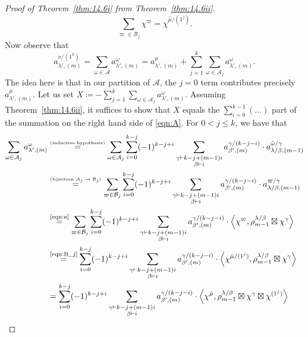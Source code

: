 \begin{proof}[Proof of Theorem~\ref{thm:14.6i} from Theorem~\ref{thm:14.6ii}]
	\begin{equation}\label{eqn:B_j}
		\sum_{\varpi\in\mathcal{B}_j}\chi^\varpi = \chi^{\hat{\mu}/(1^j)}.
	\end{equation}
	Now observe that
	\[ a^{\nu/(1^k)}_{\lambda',(m)} = \sum_{\omega\in\mathcal{A}} a^{\omega}_{\lambda',(m)} = a^{\mu}_{\lambda',(m)} + \sum_{j=1}^k \sum_{\omega\in\mathcal{A}_j} a^{\omega}_{\lambda',(m)}. \]
	The idea here is that in our partition of $\mathcal{A}$, the $j=0$ term contributes precisely $a^{\mu}_{\lambda',(m)}$. Let us set $X \coloneqq  -\sum_{j=1}^k \sum_{\omega\in\mathcal{A}_j} a^{\omega}_{\lambda',(m)}$. Assuming Theorem~\ref{thm:14.6ii}, it suffices to show that $X$ equals the $\sum_{i=0}^{k-1}(\dotsc)$ part of the summation on the right hand side of \eqref{eqn:A}. For $0<j\leq k$, we have that
	\begin{align*}
		\sum_{\omega\in\mathcal{A}_j} a^{\omega}_{\lambda',(m)} &\overset{\text{\normalfont\tiny(inductive hypothesis)}}{=} \sum_{\omega\in\mathcal{A}_j} \sum_{i=0}^{k-j}(-1)^{k-j+i}\sum_{\substack{\gamma\vdash k-j + (m-1)i\\ \beta\vdash i}}a^{\gamma/(k-j-i)}_{\beta',(m)}\cdot a^{\hat{\omega}/\gamma}_{\lambda/\beta,(m-1)}\\
		&\overset{\text{\normalfont\tiny(bijection $\mathcal{A}_j\to\mathcal{B}_j$)}}{=}\sum_{\varpi\in\mathcal{B}_j} \sum_{i=0}^{k-j}(-1)^{k-j+i}\sum_{\substack{\gamma\vdash k-j + (m-1)i\\ \beta\vdash i}}a^{\gamma/(k-j-i)}_{\beta',(m)}\cdot a^{\varpi/\gamma}_{\lambda/\beta,(m-1)}
		\\
		&\overset{\normalfont\tiny \text{\eqref{eqn:a}}}{=}\sum_{\varpi\in\mathcal{B}_j} \sum_{i=0}^{k-j}(-1)^{k-j+i}\sum_{\substack{\gamma\vdash k-j + (m-1)i\\ \beta\vdash i}}a^{\gamma/(k-j-i)}_{\beta',(m)}\cdot \left\langle\chi^{\varpi},\rho^{\lambda/\beta}_{m-1}\boxtimes\chi^\gamma\right\rangle \\
		&\overset{\normalfont\tiny\text{\eqref{eqn:B_j}}}{=}\sum_{i=0}^{k-j}(-1)^{k-j+i}\sum_{\substack{\gamma\vdash k-j + (m-1)i\\ \beta\vdash i}}a^{\gamma/(k-j-i)}_{\beta',(m)}\cdot \left\langle\chi^{\hat{\mu}/(1^j)},\rho^{\lambda/\beta}_{m-1}\boxtimes\chi^\gamma\right\rangle
		\\
		&=\sum_{i=0}^{k-j}(-1)^{k-j+i}\sum_{\substack{\gamma\vdash k-j + (m-1)i\\ \beta\vdash i}} a^{\gamma/(k-j-i)}_{\beta',(m)}\cdot \left\langle\chi^{\hat{\mu}},\rho^{\lambda/\beta}_{m-1}\boxtimes\chi^\gamma\boxtimes\chi^{(1^j)}\right\rangle\\

\end{align*}
\end{proof}
